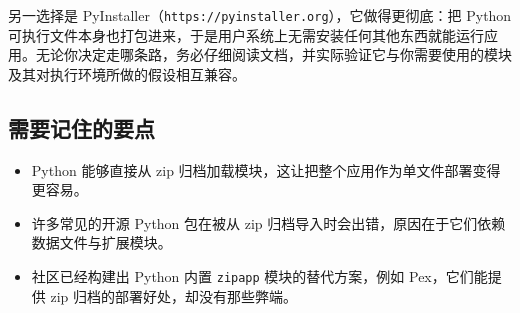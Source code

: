 
另一选择是 PyInstaller（\texttt{https://pyinstaller.org}），它做得更彻底：把 Python 可执行文件本身也打包进来，于是用户系统上无需安装任何其他东西就能运行应用。无论你决定走哪条路，务必仔细阅读文档，并实际验证它与你需要使用的模块及其对执行环境所做的假设相互兼容。

\subsection{需要记住的要点}

\begin{itemize}
\item Python 能够直接从 zip 归档加载模块，这让把整个应用作为单文件部署变得更容易。
\item 许多常见的开源 Python 包在被从 zip 归档导入时会出错，原因在于它们依赖数据文件与扩展模块。
\item 社区已经构建出 Python 内置 \texttt{zipapp} 模块的替代方案，例如 Pex，它们能提供 zip 归档的部署好处，却没有那些弊端。
\end{itemize}
